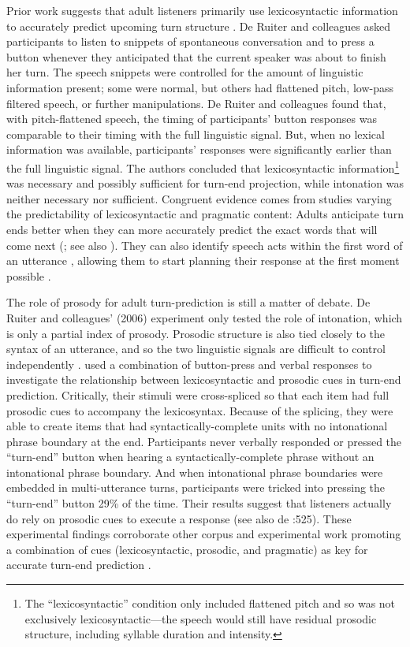 \documentclass[authoryear, 12pt]{elsarticle}
\begin{document}
Prior work suggests that adult listeners primarily use lexicosyntactic information to accurately predict upcoming turn structure \citep{de-ruiter2006}. De Ruiter and colleagues \citeyearpar{de-ruiter2006} asked participants to listen to snippets of spontaneous conversation and to press a button whenever they anticipated that the current speaker was about to finish her turn. The speech snippets were controlled for the amount of linguistic information present; some were normal, but others had flattened pitch, low-pass filtered speech, or further manipulations. De Ruiter and colleagues found that, with pitch-flattened speech, the timing of participants' button responses was comparable to their timing with the full linguistic signal. But, when no lexical information was available, participants' responses were significantly earlier than the full linguistic signal. The authors concluded that lexicosyntactic information\footnote{The ``lexicosyntactic'' condition only included flattened pitch and so was not exclusively lexicosyntactic---the speech would still have residual prosodic structure, including syllable duration and intensity.} was necessary and possibly sufficient for turn-end projection, while intonation was neither necessary nor sufficient. Congruent evidence comes from studies varying the predictability of lexicosyntactic and pragmatic content: Adults anticipate turn ends better when they can more accurately predict the exact words that will come next (\citealp{magyari2012}; see also \citealp{magyariUndRev}). They can also identify speech acts within the first word of an utterance \citep{gisladottirUndRev}, allowing them to start planning their response at the first moment possible \citep{bogelsmagyariInPrep}.

The role of prosody for adult turn-prediction is still a matter of debate. De Ruiter and colleagues' (2006) experiment only tested the role of intonation, which is only a partial index of prosody. Prosodic structure is also tied closely to the syntax of an utterance, and so the two linguistic signals are difficult to control independently \citep{ford1996}. \citet*{torreiraUndRev} used a combination of button-press and verbal responses to investigate the relationship between lexicosyntactic and prosodic cues in turn-end prediction. Critically, their stimuli were cross-spliced so that each item had full prosodic cues to accompany the lexicosyntax. Because of the splicing, they were able to create items that had syntactically-complete units with no intonational phrase boundary at the end. Participants never verbally responded or pressed the ``turn-end'' button when hearing a syntactically-complete phrase without an intonational phrase boundary. And when intonational phrase boundaries were embedded in multi-utterance turns, participants were tricked into pressing the ``turn-end'' button 29\% of the time. Their results suggest that listeners actually do rely on prosodic cues to execute a response (see also de \citet{de-ruiter2006}:525). These experimental findings corroborate other corpus and experimental work promoting a combination of cues (lexicosyntactic, prosodic, and pragmatic) as key for accurate turn-end prediction \citep{duncan1972, ford1996, hirvenkari2013}.
\end{document}
